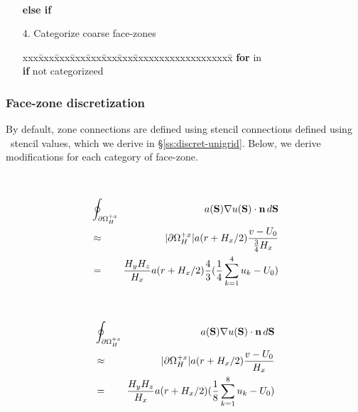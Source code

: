 \documentclass[10pt]{article}
\begin{document}
\begin{itemize}
\begin{tabbing}
\>\>\>\>\>\>  \\
\>\>\>\>\> \textbf{else if}  \\
\>\>\>\>\>\> 
\end{tabbing}
\item[4.] Categorize coarse face-zones
\begin{tabbing}
xxx\=xxx\=xxx\=xxx\=xxx\=xxx\=xxx\=xxxxxxxxxxxxxxxxxxx\=\kill
\> \textbf{for}  in  \\
\>\> \textbf{if}  not categorizeed \\
\>\>\>        
\end{tabbing}
\end{itemize}


\subsubsection{Face-zone discretization}

By default, zone connections are defined using stencil connections defined
using \hypre\ stencil values, which we derive in \S\ref{ss:discret-unigrid}.
Below, we derive modifications for each category of face-zone.


\begin{minipage}{1.75in}
\end{minipage} \ \ \ \ 
\begin{minipage}{4.00in}
\begin{eqnarray*}
& \oint_{\partial\Omega_H^{+x}}  \!\!\! & a(\textbf{S}) \nabla u(\textbf{S})\cdot \textbf{n} \, d\textbf{S}  \\
& \approx & |\partial\Omega_H^{+x}| a(r+H_x/2) \frac{v - U_0}{\frac{3}{4}H_x} \\
& = & \frac{H_yH_z}{H_x} a(r+H_x/2) \frac{4}{3} (\frac{1}{4} \sum_{k=1}^4 u_k - U_0)   \\
\end{eqnarray*}
\end{minipage}


\begin{minipage}{1.75in}
\end{minipage} \ \ \ \ 
\begin{minipage}{4.00in}
\begin{eqnarray*}
& \oint_{\partial\Omega_H^{+x}} \!\!\! & a(\textbf{S}) \nabla u(\textbf{S})\cdot \textbf{n} \, d\textbf{S}  \\
& \approx & |\partial\Omega_H^{+x}| a(r+H_x/2) \frac{v - U_0}{H_x} \\
& = & \frac{H_yH_z}{H_x}  a(r+H_x/2) (\frac{1}{8} \sum_{k=1}^8 u_k - U_0)   \\
\end{eqnarray*}
\end{minipage}
\end{document}
